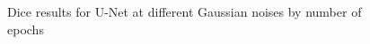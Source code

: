 \begin{figure}
    \centerline{}
    \caption{Dice results for U-Net at different Gaussian noises by number of epochs}
    \label{fig:all-noises-by-epoch-dice-unet}
\end{figure}

